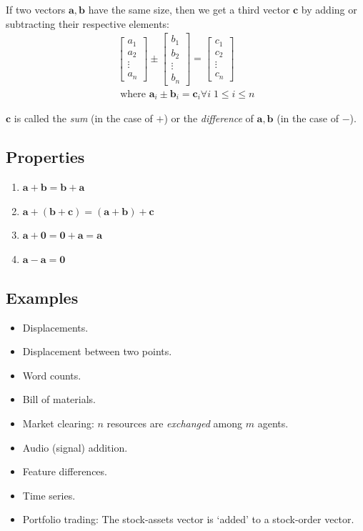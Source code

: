 \documentclass[11pt]{book}
\theoremstyle{definition}
\theoremstyle{plain}
\theoremstyle{problemstyle}
\theoremstyle{remark}
\theoremstyle{definition}
\begin{document}
If two vectors $\boldsymbol{a, b}$ have the same size, then we get a third vector $\boldsymbol{c}$ by adding or subtracting their respective elements:
\begin{equation}
        \label{eq:vector-addition}
    \begin{aligned}
    \begin{bmatrix}
        a_1\\
        a_2\\
        \vdots\\
        a_n
    \end{bmatrix}
    \pm
    \begin{bmatrix}
        b_1\\
        b_2\\
        \vdots\\
        b_n
    \end{bmatrix}
    =
    \begin{bmatrix}
        c_1\\
        c_2\\
        \vdots\\
        c_n
    \end{bmatrix}\\
        \text{ where } \boldsymbol{a}_i\pm\boldsymbol{b}_i=\boldsymbol{c}_i \forall i\; 1\leq i\leq n
    \end{aligned}
\end{equation}

    $\boldsymbol{c}$ is called the \emph{sum} (in the case of $+$) or the \emph{difference} of $\boldsymbol{a,b}$ (in the case of $-$).


\subsection*{Properties}
\label{ss:vector-addition-properties}
\begin{enumerate}
    \item $\boldsymbol{a+b=b+a}$
    \item $\boldsymbol{a+(b+c)=(a+b)+c}$
    \item $\boldsymbol{a+0=0+a=a}$
    \item $\boldsymbol{a-a=0}$
\end{enumerate}
\subsection*{Examples}
\begin{itemize}
    \item Displacements.
    \item Displacement between two points.
    \item Word counts.
    \item Bill of materials.
    \item Market clearing: $n$ resources are \emph{exchanged} among $m$ agents.
    \item Audio (signal) addition.
    \item Feature differences.
    \item Time series.
    \item Portfolio trading: The stock-assets vector is `added' to a stock-order vector.
\end{itemize}
\end{document}
